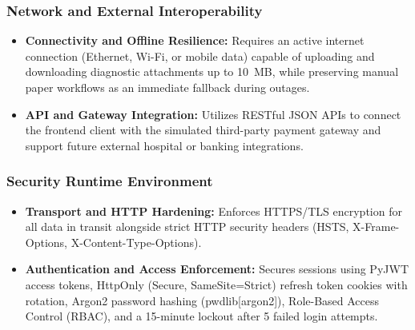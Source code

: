 \documentclass[11pt,a4paper]{article}
\begin{document}
\subsubsection{Network and External Interoperability}
\begin{itemize}
    \item \textbf{Connectivity and Offline Resilience:} Requires an active internet connection (Ethernet, Wi-Fi, or mobile data) capable of uploading and downloading diagnostic attachments up to 10~MB, while preserving manual paper workflows as an immediate fallback during outages.

    \item \textbf{API and Gateway Integration:} Utilizes RESTful JSON APIs to connect the frontend client with the simulated third-party payment gateway and support future external hospital or banking integrations.
\end{itemize}

\subsubsection{Security Runtime Environment}
\begin{itemize}
    \item \textbf{Transport and HTTP Hardening:} Enforces HTTPS/TLS encryption for all data in transit alongside strict HTTP security headers (HSTS, X-Frame-Options, X-Content-Type-Options).

    \item \textbf{Authentication and Access Enforcement:} Secures sessions using PyJWT access tokens, HttpOnly (Secure, SameSite=Strict) refresh token cookies with rotation, Argon2 password hashing (pwdlib[argon2]), Role-Based Access Control (RBAC), and a 15-minute lockout after 5 failed login attempts.
\end{itemize}
\end{document}
